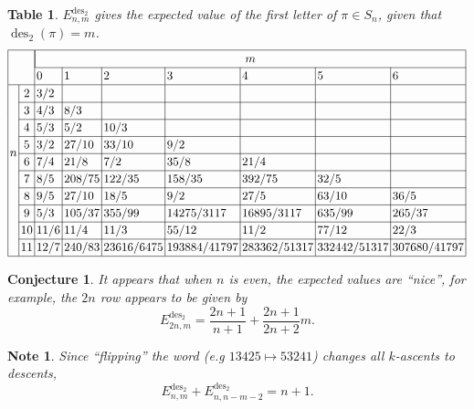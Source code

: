 \documentclass{article}
\newcommand{\n}[1]{\multicolumn{1}{|c|}{#1}}
\newtheorem{conjecture}[theo]{Conjecture}
\newtheorem{datatable}[theo]{Table}
\newtheorem{note}[theo]{Note}
\begin{document}
\begin{datatable}
  $E_{n,m}^{\text{des}_2}$ gives the expected value of the first letter of $\pi \in S_n$,
  given that $\operatorname{des}_2(\pi) = m$.
\[
  \everymath={\displaystyle}
  \arraycolsep=1.4pt\def\arraystretch{1.2}
  \begin{array}{|ll|l|l|l|l|l|l|l|}
    \hline
    & & \multicolumn{7}{|c|}{m} \\ \cline{3-9}
    & & 0 & 1 & 2 & 3 & 4 & 5 & 6\\ \hline
    \multirow{8}{*}{$n$}
    & \n{2}  & 3/2  &        &            &              &              &              &              \\ \cline{2-9}
    & \n{3}  & 4/3  & 8/3    &            &              &              &              &              \\ \cline{2-9}
    & \n{4}  & 5/3  & 5/2    & 10/3       &              &              &              &              \\ \cline{2-9}
    & \n{5}  & 3/2  & 27/10  & 33/10      & 9/2          &              &              &              \\ \cline{2-9}
    & \n{6}  & 7/4  & 21/8   & 7/2        & 35/8         & 21/4         &              &              \\ \cline{2-9}
    & \n{7}  & 8/5  & 208/75 & 122/35     & 158/35       & 392/75       & 32/5         &              \\ \cline{2-9}
    & \n{8}  & 9/5  & 27/10  & 18/5       & 9/2          & 27/5         & 63/10        & 36/5         \\ \cline{2-9}
    & \n{9}  & 5/3  & 105/37 & 355/99     & 14275/3117   & 16895/3117   & 635/99       & 265/37       \\ \cline{2-9}
    & \n{10} & 11/6 & 11/4   & 11/3       & 55/12        & 11/2         & 77/12        & 22/3         \\ \cline{2-9}
    & \n{11} & 12/7 & 240/83 & 23616/6475 & 193884/41797 & 283362/51317 & 332442/51317 & 307680/41797 \\ \hline
  \end{array}
\]
\end{datatable}
\begin{conjecture}
  It appears that when $n$ is even, the expected values are ``nice'', for example,
  the $2n$ row appears to be given by \[
    E_{2n,m}^{\text{des}_2} = \frac{2n+1}{n+1} + \frac{2n+1}{2n+2}m.
  \]
\end{conjecture}
\begin{note}
  Since ``flipping'' the word (e.g $13425 \mapsto 53241$) changes all $k$-ascents to descents, \[
    E_{n,m}^{\text{des}_2} + E_{n,n-m-2}^{\text{des}_2} = n + 1.
  \]
\end{note}
\end{document}
